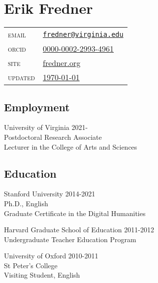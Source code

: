 \documentclass[
  12pt,
  letterpaper,
]{article}
\author{}
\date{}
\begin{document}
\hypertarget{erik-fredner}{%
\section{Erik Fredner}\label{erik-fredner}}

\begin{longtable}[]{@{}ll@{}}
\endhead
\endlastfoot
\textsc{email} &
\href{mailto:fredner@virginia.edu}{\nolinkurl{fredner@virginia.edu}} \\
\textsc{orcid} &
\href{https://orcid.org/0000-0002-2993-4961}{0000-0002-2993-4961} \\
\textsc{site} & \href{https://fredner.org}{fredner.org} \\
\textsc{updated} & \href{https://github.com/erikfredner/cv}{\today} \\
\end{longtable}

\hypertarget{employment}{%
\subsection{Employment}\label{employment}}

University of Virginia \hfill 2021-\\
\hspace*{0.333em} Postdoctoral Research Associate\\
\hspace*{0.333em} Lecturer in the College of Arts and Sciences

\hypertarget{education}{%
\subsection{Education}\label{education}}

Stanford University \hfill 2014-2021\\
\hspace*{0.333em} Ph.D., English\\
\hspace*{0.333em} Graduate Certificate in the Digital Humanities

Harvard Graduate School of Education \hfill 2011-2012\\
\hspace*{0.333em} Undergraduate Teacher Education Program

University of Oxford \hfill 2010-2011\\
\hspace*{0.333em} St Peter's College\\
\hspace*{0.333em} Visiting Student, English
\end{document}
